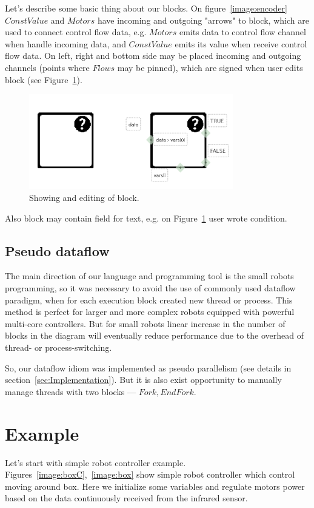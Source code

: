 \documentclass[conference,compsoc]{IEEEtran}
\begin{document}
Let's describe some basic thing about our blocks. On figure~\ref{image:encoder} $ConstValue$ and $Motors$ have incoming and outgoing "arrows" to block, which are used to connect control flow data, e.g. $Motors$ emits data to control flow channel when handle incoming data, and $ConstValue$ emits its value when receive control flow data. On left, right and bottom side may be placed incoming and outgoing channels (points where $Flows$ may be pinned), which are signed when user edits block (see Figure~\ref{image:block}).
\begin{figure}[ht]
	\centering
	\includegraphics[width=3.5in]{block.png}
	\caption{Showing and editing of block.}
	\label{image:block}
\end{figure}
Also block may contain field for text, e.g. on Figure~\ref{image:block} user wrote condition.



\subsection{Pseudo dataflow}
The main direction of our language and programming tool is the small robots programming, so it was necessary to avoid the use of commonly used dataflow paradigm, when for each execution block created new thread or process. This method is perfect for larger and more complex robots equipped with powerful multi-core controllers. But for small robots linear increase in the number of blocks in the diagram will eventually reduce performance due to the overhead of thread- or process-switching.

So, our dataflow idiom was implemented as pseudo parallelism (see details in section~\ref{sec:Implementation}). But it is also exist opportunity to manually manage threads with two blocks --- $Fork, EndFork$.

\section{Example}
\label{sec:example}
Let's start with simple robot controller example. Figures~\ref{image:boxC},~\ref{image:box} show simple robot controller which control moving around box. Here we initialize some variables and regulate motors power based on the data continuously received from the infrared sensor. 
\end{document}
